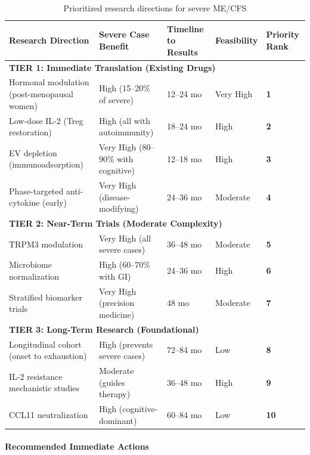 \begin{table}[h]
\centering
\caption{Prioritized research directions for severe ME/CFS}
\label{tab:research-priorities}
\begin{tabular}{p{4.5cm}p{2cm}p{2cm}p{2cm}p{2.5cm}}
\toprule
\textbf{Research Direction} & \textbf{Severe Case Benefit} & \textbf{Timeline to Results} & \textbf{Feasibility} & \textbf{Priority Rank} \\
\midrule
\multicolumn{5}{l}{\textbf{TIER 1: Immediate Translation (Existing Drugs)}} \\
Hormonal modulation (post-menopausal women) & High (15--20\% of severe) & 12--24 mo & Very High & \textbf{1} \\
Low-dose IL-2 (Treg restoration) & High (all with autoimmunity) & 18--24 mo & High & \textbf{2} \\
EV depletion (immunoadsorption) & Very High (80--90\% with cognitive) & 12--18 mo & High & \textbf{3} \\
Phase-targeted anti-cytokine (early) & Very High (disease-modifying) & 24--36 mo & Moderate & \textbf{4} \\
\midrule
\multicolumn{5}{l}{\textbf{TIER 2: Near-Term Trials (Moderate Complexity)}} \\
TRPM3 modulation & Very High (all severe cases) & 36--48 mo & Moderate & \textbf{5} \\
Microbiome normalization & High (60--70\% with GI) & 24--36 mo & High & \textbf{6} \\
Stratified biomarker trials & Very High (precision medicine) & 48 mo & Moderate & \textbf{7} \\
\midrule
\multicolumn{5}{l}{\textbf{TIER 3: Long-Term Research (Foundational)}} \\
Longitudinal cohort (onset to exhaustion) & High (prevents severe cases) & 72--84 mo & Low & \textbf{8} \\
IL-2 resistance mechanistic studies & Moderate (guides therapy) & 36--48 mo & High & \textbf{9} \\
CCL11 neutralization & High (cognitive-dominant) & 60--84 mo & Low & \textbf{10} \\
\bottomrule
\end{tabular}
\end{table}

\paragraph{Recommended Immediate Actions}

